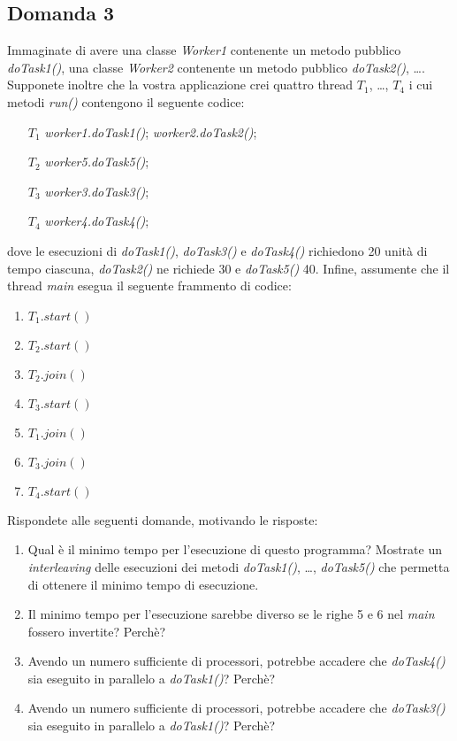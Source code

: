 \newpage

\subsection{Domanda 3}
Immaginate di avere una classe \textit{Worker1} contenente un metodo pubblico \textit{doTask1()}, una classe \textit{Worker2} contenente un metodo pubblico \textit{doTask2()}, \ldots . Supponete inoltre che la vostra applicazione crei quattro thread $T_1$, \ldots, $T_4$ i cui metodi \textit{run()} contengono il seguente codice:
\begin{itemize}
	\item[$T_1$] \textit{worker1.doTask1()}; \textit{worker2.doTask2()};
	\item[$T_2$] \textit{worker5.doTask5()};
	\item[$T_3$] \textit{worker3.doTask3()};
	\item[$T_4$] \textit{worker4.doTask4()};
\end{itemize}
dove le esecuzioni di \textit{doTask1()}, \textit{doTask3()} e \textit{doTask4()} richiedono 20 unit\`{a} di tempo ciascuna, \textit{doTask2()} ne richiede 30 e \textit{doTask5()} 40. Infine, assumente che il thread \textit{main} esegua il seguente frammento di codice:
\begin{enumerate}
	\item $T_1.start()$
	\item $T_2.start()$
	\item $T_2.join()$
	\item $T_3.start()$
	\item $T_1.join()$
	\item $T_3.join()$
	\item $T_4.start()$
\end{enumerate}
Rispondete alle seguenti domande, motivando le risposte:
\begin{enumerate}
	\item Qual è il minimo tempo per l'esecuzione di questo programma? Mostrate un \textit{interleaving} delle esecuzioni dei metodi \textit{doTask1()}, \ldots, \textit{doTask5()} che permetta di ottenere il minimo tempo di esecuzione.
	\item Il minimo tempo per l'esecuzione sarebbe diverso se le righe 5 e 6 nel \textit{main} fossero invertite? Perch\`e?
	\item Avendo un numero sufficiente di processori, potrebbe accadere che \textit{doTask4()} sia eseguito in parallelo a \textit{doTask1()}? Perch\`e?
	\item Avendo un numero sufficiente di processori, potrebbe accadere che \textit{doTask3()} sia eseguito in parallelo a \textit{doTask1()}? Perch\`e?
\end{enumerate}

